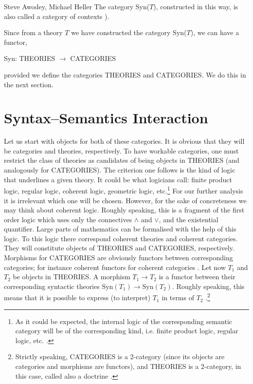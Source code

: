 \begin{artengenv2auth}{Steve Awodey, Michael Heller}
The category Syn($T$), constructed in this way, is also called a category of contexts \parencite[for details see][]{Fu,nLabSubs}). 

Since from a theory $T$ we have constructed the category Syn($T$), we can have a  functor,
\begin{center}
Syn: THEORIES $\to$ CATEGORIES
\end{center}
provided we define the categories THEORIES and CATEGORIES. We do this in the next section.

\section{Syntax--Semantics Interaction}
Let us start with objects for both of these categories. It is obvious that they will be categories and theories, respectively. To have  workable categories, one must restrict the class of theories as candidates of being objects in THEORIES (and analogously for CATEGORIES). The criterion one follows is the kind of logic that underlines a given theory. It could be what logicians call: finite product logic, regular logic, coherent logic, geometric logic, etc.\footnote{As it could be expected, the internal logic of the corresponding semantic category will be of the corresponding kind, i.e. finite product logic, regular logic, etc. \parencite{nLab2}.} For our further analysis it is irrelevant which one will be chosen. However, for the sake of concreteness we may think about coherent logic. Roughly speaking, this is a fragment of the first order logic which uses only the connectives $\wedge $ and $\vee $, and the existential quantifier. Large parts of mathematics can be formalised with the help of this logic. To this logic there correspond coherent theories and coherent categories. They will constitute objects of THEORIES and CATEGORIES, respectively.
Morphisms for CATEGORIES are obviously functors between corresponding categories; for instance coherent functors for coherent categories \parencite{nLabCoherent}.  Let now $T_1$ and $T_2$ be objects in THEORIES. A morphism $T_1 \to T_2$ is a functor between their corresponding syntactic theories $\mathrm{Syn}(T_1) \to \mathrm{Syn}(T_2)$. Roughly speaking, this means that it is possible to express (to interpret) $T_1$ in terms of $T_2$ \parencite[for details and discussion see][]{Halvorson2017}.\footnote{Strictly speaking, CATEGORIES is a 2-category (since its objects are categories and morphisms are functors), and THEORIES is a 2-category, in this case, called also a doctrine \parencite{nLabDoctrine}.}


\end{artengenv2auth}
